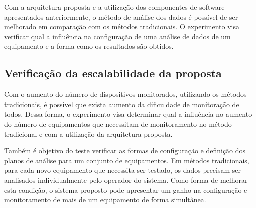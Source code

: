 Com a arquitetura proposta e a utilização dos componentes de software apresentados anteriormente, o
método de análise dos dados é possível de ser melhorado em comparação com os métodos tradicionais. O
experimento visa verificar qual a influência na configuração de uma análise de dados de um
equipamento e a forma como os resultados são obtidos.


\subsection{Verificação da escalabilidade da proposta}
\label{sub:experimentos-escalabilidade}

Com o aumento do número de dispositivos monitorados, utilizando os métodos tradicionais, é possível
que exista aumento da dificuldade de monitoração de todos. Dessa forma, o experimento visa
determinar qual a influência no aumento do número de equipamentos que necessitam de monitoramento no
método tradicional e com a utilização da arquitetura proposta.

Também é objetivo do teste verificar as formas de configuração e definição dos planos de análise
para um conjunto de equipamentos. Em métodos tradicionais, para cada novo equipamento que necessita
ser testado, os dados precisam ser analisados individualmente pelo operador do sistema. Como forma
de melhorar esta condição, o sistema proposto pode apresentar um ganho na configuração e
monitoramento de mais de um equipamento de forma simultânea.
